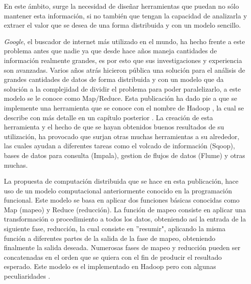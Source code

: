 En este \'ambito, surge la necesidad de dise\~nar herramientas que puedan no s\'olo mantener esta informaci\'on, si no también que tengan la capacidad de analizarla y extraer el valor que se desea de una forma distribuida y con un modelo sencillo. 

\textit{Google}, el buscador de internet m\'as utilizado en el mundo, ha hecho frente a este problema antes que nadie ya que desde hace a\~nos maneja cantidades de información realmente grandes, es por esto que sus investigaciones y experiencia son avanzadas. Varios a\~nos atrás hicieron p\'ublica \cite{paper-mapreduce} una solución para el an\'alisis de grandes cantidades de datos de forma distribuida y con un modelo que da soluci\'on a la complejidad de dividir el problema para poder paralelizarlo, a este modelo se le conoce como Map/Reduce. Esta publicación ha dado pie a que se implemente una herramienta que se conoce con el nombre de Hadoop \cite{hadoop}, la cual se describe con m\'as detalle en un cap\'itulo posterior . La creaci\'on de esta herramienta y el hecho de que se hayan obtenidos buenos resultados de su utilizaci\'on, ha provocado que surjan otras muchas herramientas a su alrededor, las cuales ayudan a diferentes tareas como el volcado de información (Sqoop), bases de datos para consulta (Impala), gestion de flujos de datos (Flume) y otras muchas.

La propuesta de computación distribuida que se hace en esta publicación, hace uso de un modelo computacional anteriormente conocido en la programación funcional. Este modelo se basa en aplicar dos funciones básicas conocidas como Map (mapeo) y Reduce (reducci\'on). La función de mapeo consiste en aplicar una transformación o procedimiento a todos los datos, obteniendo así la entrada de la siguiente fase, reducción, la cual consiste en ''resumir", aplicando la misma función a diferentes partes de la salida de la fase de mapeo, obteniendo finalmente la salida deseada. Numerosas fases de mapeo y reducción pueden ser concatenadas en el orden que se quiera con el fin de producir el resultado esperado. Este modelo es el implementado en Hadoop pero con algunas peculiaridades .
